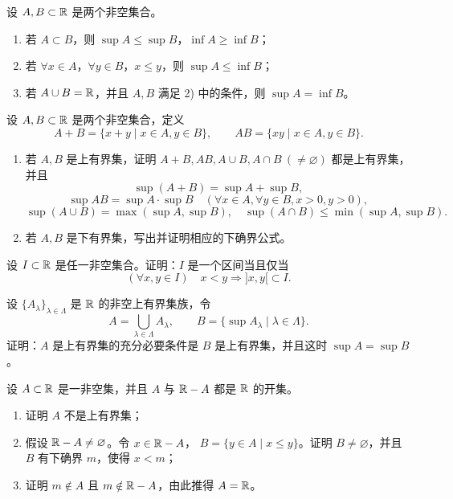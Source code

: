 \begin{exercise}
\item 设 \(A,B\subset\mathbb{R}\) 是两个非空集合。
\begin{enumerate}[label=\arabic*)]
  \item 若 \(A\subset B\)，则 \(\sup A\leqslant\sup B\)，\(\inf A\geqslant\inf B\)；
  \item 若 \(\forall x\in A\)，\(\forall y\in B\)，\(x\leqslant y\)，则 \(\sup A\leqslant\inf B\)；
  \item 若 \(A\cup B=\mathbb{R}\)，并且 \(A,B\) 满足 2) 中的条件，则 \(\sup A=\inf B\)。
\end{enumerate}
\end{exercise}

\begin{exercise}
\item 设 \(A,B\subset\mathbb{R}\) 是两个非空集合，定义
\[
A+B=\{x+y\mid x\in A,y\in B\},\qquad AB=\{xy\mid x\in A,y\in B\}.
\]
\begin{enumerate}[label=\arabic*)]
  \item 若 \(A,B\) 是上有界集，证明 \(A+B,AB,A\cup B,A\cap B\ (\ne\varnothing)\) 都是上有界集，并且
  \[
  \sup(A+B)=\sup A+\sup B,
  \]
  \[
  \sup AB=\sup A\cdot\sup B\quad(\forall x\in A,\forall y\in B, x>0,y>0),
  \]
  \[
  \sup(A\cup B)=\max(\sup A,\sup B),\quad
  \sup(A\cap B)\leqslant\min(\sup A,\sup B).
  \]
  \item 若 \(A,B\) 是下有界集，写出并证明相应的下确界公式。
\end{enumerate}
\end{exercise}

\begin{exercise}
\item 设 \(I\subset\mathbb{R}\) 是任一非空集合。证明：\(I\) 是一个区间当且仅当
\[
(\forall x,y\in I)\quad x<y\Longrightarrow ]x,y[\subset I.
\]
\end{exercise}

\begin{exercise}
\item 设 \(\{A_\lambda\}_{\lambda\in\Lambda}\) 是 \(\mathbb{R}\) 的非空上有界集族，令
\[
A=\bigcup_{\lambda\in\Lambda}A_\lambda,\qquad
B=\{\sup A_\lambda\mid\lambda\in\Lambda\}.
\]
证明：\(A\) 是上有界集的充分必要条件是 \(B\) 是上有界集，并且这时
\(\sup A=\sup B\)。
\end{exercise}

\begin{exercise}
\item 设 \(A\subset\mathbb{R}\) 是一非空集，并且 \(A\) 与 \(\mathbb{R}-A\) 都是 \(\mathbb{R}\) 的开集。
\begin{enumerate}[label=\arabic*)]
  \item 证明 \(A\) 不是上有界集；
  \item 假设 \(\mathbb{R}-A\ne\varnothing\)。令 \(x\in\mathbb{R}-A\)，
  \(B=\{y\in A\mid x\leqslant y\}\)。证明 \(B\ne\varnothing\)，并且
  \(B\) 有下确界 \(m\)，使得 \(x<m\)；
  \item 证明 \(m\notin A\) 且 \(m\notin\mathbb{R}-A\)，由此推得 \(A=\mathbb{R}\)。
\end{enumerate}
\end{exercise}


